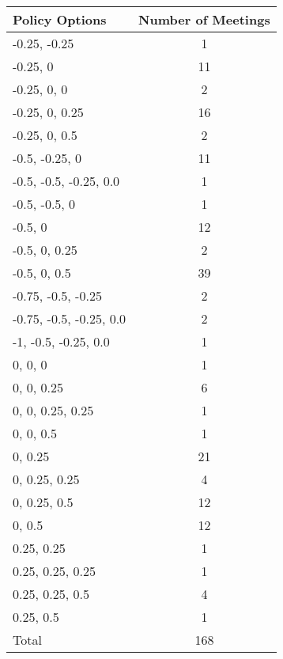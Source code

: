 \begin{tabular}{lc}
\hline\hline 
\addlinespace 
Policy Options & Number of Meetings \\ 
\hline 
-0.25, -0.25 & 1 \\
-0.25, 0 & 11 \\
-0.25, 0, 0 & 2 \\
-0.25, 0, 0.25 & 16 \\
-0.25, 0, 0.5 & 2 \\
-0.5, -0.25, 0 & 11 \\
-0.5, -0.5, -0.25, 0.0 & 1 \\
-0.5, -0.5, 0 & 1 \\
-0.5, 0 & 12 \\
-0.5, 0, 0.25 & 2 \\
-0.5, 0, 0.5 & 39 \\
-0.75, -0.5, -0.25 & 2 \\
-0.75, -0.5, -0.25, 0.0 & 2 \\
-1, -0.5, -0.25, 0.0 & 1 \\
0, 0, 0 & 1 \\
0, 0, 0.25 & 6 \\
0, 0, 0.25, 0.25 & 1 \\
0, 0, 0.5 & 1 \\
0, 0.25 & 21 \\
0, 0.25, 0.25 & 4 \\
0, 0.25, 0.5 & 12 \\
0, 0.5 & 12 \\
0.25, 0.25 & 1 \\
0.25, 0.25, 0.25 & 1 \\
0.25, 0.25, 0.5 & 4 \\
0.25, 0.5 & 1 \\
\addlinespace 
Total & 168 \\
\hline 
\end{tabular}